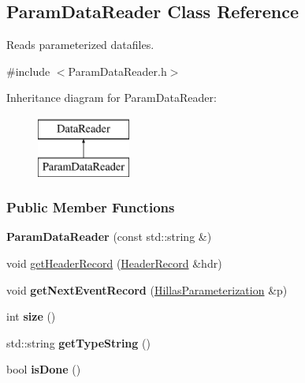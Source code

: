 \hypertarget{classParamDataReader}{
\subsection{ParamDataReader Class Reference}
\label{classParamDataReader}
}


Reads parameterized datafiles.  




{\ttfamily \#include $<$ParamDataReader.h$>$}

Inheritance diagram for ParamDataReader:\begin{figure}[H]
\begin{center}
\leavevmode
\includegraphics[height=2.000000cm]{classParamDataReader}
\end{center}
\end{figure}
\subsubsection*{Public Member Functions}
\begin{DoxyCompactItemize}
\item 
\hypertarget{classParamDataReader_aae754bb6e204efc6d413fdc714de8e72}{
{\bfseries ParamDataReader} (const std::string \&)}
\label{classParamDataReader_aae754bb6e204efc6d413fdc714de8e72}

\item 
void \hyperlink{classParamDataReader_a6c08000e4e3d408ae14b3146145a1249}{getHeaderRecord} (\hyperlink{structHeaderRecord}{HeaderRecord} \&hdr)
\item 
\hypertarget{classParamDataReader_a505e3e8277b669c56833d64d8d8f291f}{
void {\bfseries getNextEventRecord} (\hyperlink{structHillasParameterization}{HillasParameterization} \&p)}
\label{classParamDataReader_a505e3e8277b669c56833d64d8d8f291f}

\item 
\hypertarget{classParamDataReader_adbedda0f1d3db56c77cfcbb4aa4392e8}{
int {\bfseries size} ()}
\label{classParamDataReader_adbedda0f1d3db56c77cfcbb4aa4392e8}

\item 
\hypertarget{classParamDataReader_afee1c056f8a35d7e1d02a4aecb1ecf6f}{
std::string {\bfseries getTypeString} ()}
\label{classParamDataReader_afee1c056f8a35d7e1d02a4aecb1ecf6f}

\item 
\hypertarget{classParamDataReader_af19fa714276ab64cd02235abd7b0bc93}{
bool {\bfseries isDone} ()}
\label{classParamDataReader_af19fa714276ab64cd02235abd7b0bc93}

\end{DoxyCompactItemize}



